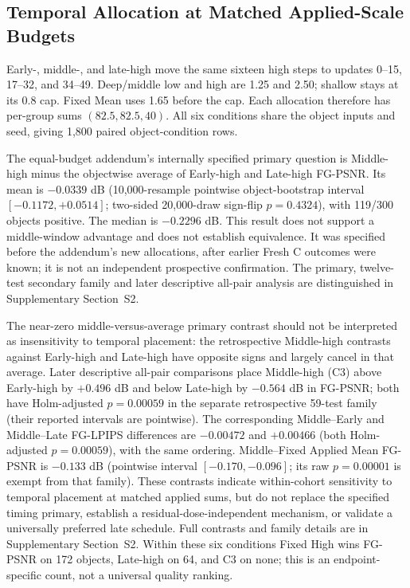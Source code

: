 \documentclass[times,twocolumn,final]{elsarticle}
\begin{document}
\subsection{Temporal Allocation at Matched Applied-Scale Budgets}
\label{subsec:matched-budget300}
Early-, middle-, and late-high move the same sixteen high steps to updates 0--15, 17--32, and 34--49. Deep/middle low and high are 1.25 and 2.50; shallow stays at its 0.8 cap. Fixed Mean uses 1.65 before the cap. Each allocation therefore has per-group sums $(82.5,82.5,40)$. All six conditions share the object inputs and seed, giving 1,800 paired object-condition rows.

The equal-budget addendum's internally specified primary question is Middle-high minus the objectwise average of Early-high and Late-high FG-PSNR. Its mean is $-0.0339$ dB (10,000-resample pointwise object-bootstrap interval $[-0.1172,+0.0514]$; two-sided 20,000-draw sign-flip $p=0.4324$), with 119/300 objects positive. The median is $-0.2296$ dB. This result does not support a middle-window advantage and does not establish equivalence. It was specified before the addendum's new allocations, after earlier Fresh C outcomes were known; it is not an independent prospective confirmation. The primary, twelve-test secondary family and later descriptive all-pair analysis are distinguished in Supplementary Section~S2.

The near-zero middle-versus-average primary contrast should not be interpreted as insensitivity to temporal placement: the retrospective Middle-high contrasts against Early-high and Late-high have opposite signs and largely cancel in that average. Later descriptive all-pair comparisons place Middle-high (C3) above Early-high by $+0.496$ dB and below Late-high by $-0.564$ dB in FG-PSNR; both have Holm-adjusted $p=0.00059$ in the separate retrospective 59-test family (their reported intervals are pointwise). The corresponding Middle--Early and Middle--Late FG-LPIPS differences are $-0.00472$ and $+0.00466$ (both Holm-adjusted $p=0.00059$), with the same ordering. Middle--Fixed Applied Mean FG-PSNR is $-0.133$ dB (pointwise interval $[-0.170,-0.096]$; its raw $p=0.00001$ is exempt from that family). These contrasts indicate within-cohort sensitivity to temporal placement at matched applied sums, but do not replace the specified timing primary, establish a residual-dose-independent mechanism, or validate a universally preferred late schedule. Full contrasts and family details are in Supplementary Section~S2. Within these six conditions Fixed High wins FG-PSNR on 172 objects, Late-high on 64, and C3 on none; this is an endpoint-specific count, not a universal quality ranking.
\end{document}
